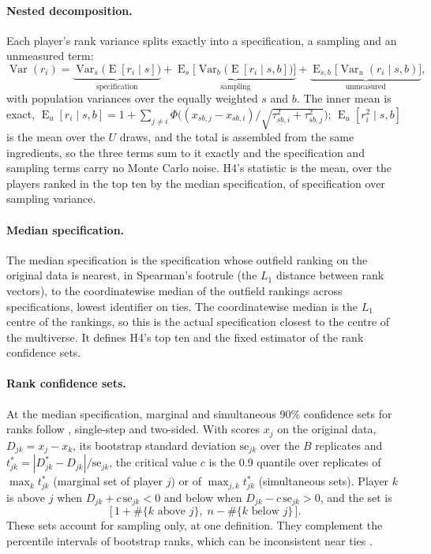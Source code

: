 \documentclass[11pt,a4paper]{article}
\DeclareMathOperator{\Var}{Var}
\DeclareMathOperator{\E}{E}
\begin{document}
\paragraph{Nested decomposition.}
Each player's rank variance splits exactly into a specification, a sampling and
an unmeasured term:
\begin{equation}
  \Var(r_i) = \underbrace{\Var_s\big(\E[r_i \mid s]\big)}_{\text{specification}}
  + \underbrace{\E_s\big[\Var_b\big(\E[r_i \mid s, b]\big)\big]}_{\text{sampling}}
  + \underbrace{\E_{s,b}\big[\Var_u(r_i \mid s, b)\big]}_{\text{unmeasured}},
  \label{eq:decomp}
\end{equation}
with population variances over the equally weighted $s$ and $b$. The inner mean
is exact, $\E_u[r_i \mid s, b] = 1 + \sum_{j \ne i} \Phi\big((x_{sb,j} - x_{sb,i}) /
\sqrt{\tau^2_{sb,i} + \tau^2_{sb,j}}\big)$; $\E_u[r_i^2 \mid s, b]$ is the mean over
the $U$ draws, and the total is assembled from the same ingredients, so the
three terms sum to it exactly and the specification and sampling terms carry no
Monte Carlo noise. H4's statistic is the mean, over the players ranked in the
top ten by the median specification, of specification over sampling variance.

\paragraph{Median specification.}
The median specification is the specification whose outfield ranking on the
original data is nearest, in Spearman's footrule (the $L_1$ distance between
rank vectors), to the coordinatewise median of the outfield rankings across
specifications, lowest identifier on ties. The coordinatewise median is the
$L_1$ centre of the rankings, so this is the actual specification closest to the
centre of the multiverse. It defines H4's top ten and the fixed estimator of the
rank confidence sets.

\paragraph{Rank confidence sets.}
At the median specification, marginal and simultaneous 90\% confidence sets for
ranks follow \citet{mogstad2024ranks}, single-step and two-sided. With scores
$x_j$ on the original data, $D_{jk} = x_j - x_k$, its bootstrap standard deviation
$\mathrm{se}_{jk}$ over the $B$ replicates and
$t^\ast_{jk} = |D^\ast_{jk} - D_{jk}| / \mathrm{se}_{jk}$, the critical value $c$ is the
0.9 quantile over replicates of $\max_k t^\ast_{jk}$ (marginal set of player $j$)
or of $\max_{j,k} t^\ast_{jk}$ (simultaneous sets). Player $k$ is above $j$ when
$D_{jk} + c\,\mathrm{se}_{jk} < 0$ and below when $D_{jk} - c\,\mathrm{se}_{jk} > 0$,
and the set is
\begin{equation}
  \big[\,1 + \#\{k \text{ above } j\},\; n - \#\{k \text{ below } j\}\,\big].
  \label{eq:mogstad}
\end{equation}
These sets account for sampling only, at one definition. They complement the
percentile intervals of bootstrap ranks, which can be inconsistent near ties
\citep{hall2009bootstrap}.
\end{document}
